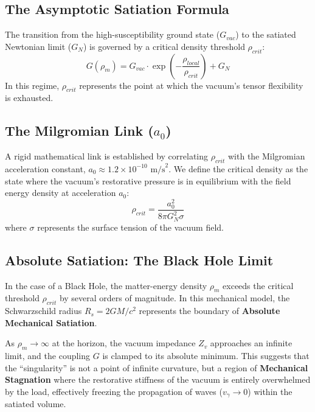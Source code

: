 \documentclass[12pt,a4paper]{article}
\begin{document}
\subsection{The Asymptotic Satiation Formula}
The transition from the high-susceptibility ground state ($G_{vac}$) to the satiated Newtonian limit ($G_N$) is governed by a critical density threshold $\rho_{crit}$:
\begin{equation}
G(\rho_m) = G_{vac} \cdot \exp\left(-\frac{\rho_{local}}{\rho_{crit}}\right) + G_{N}
\end{equation}
In this regime, $\rho_{crit}$ represents the point at which the vacuum's tensor flexibility is exhausted.

\subsection{The Milgromian Link ($a_0$)}
A rigid mathematical link is established by correlating $\rho_{crit}$ with the Milgromian acceleration constant, $a_0 \approx 1.2 \times 10^{-10} \text{ m/s}^2$. We define the critical density as the state where the vacuum's restorative pressure is in equilibrium with the field energy density at acceleration $a_0$:
\begin{equation}
\rho_{crit} = \frac{a_0^2}{8\pi G_N^2 \sigma}
\end{equation}
where $\sigma$ represents the surface tension of the vacuum field.

\subsection{Absolute Satiation: The Black Hole Limit}
In the case of a Black Hole, the matter-energy density $\rho_m$ exceeds the critical threshold $\rho_{crit}$ by several orders of magnitude. In this mechanical model, the Schwarzschild radius $R_s = 2GM/c^2$ represents the boundary of \textbf{Absolute Mechanical Satiation}. 

As $\rho_m \to \infty$ at the horizon, the vacuum impedance $Z_v$ approaches an infinite limit, and the coupling $G$ is clamped to its absolute minimum. This suggests that the ``singularity'' is not a point of infinite curvature, but a region of \textbf{Mechanical Stagnation} where the restorative stiffness of the vacuum is entirely overwhelmed by the load, effectively freezing the propagation of waves ($v_\gamma \to 0$) within the satiated volume.
\end{document}
